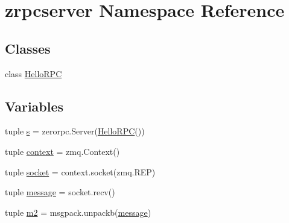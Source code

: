 \hypertarget{namespacezrpcserver}{\section{zrpcserver Namespace Reference}
\label{namespacezrpcserver}
}
\subsection*{Classes}
\begin{DoxyCompactItemize}
\item 
class \hyperlink{classzrpcserver_1_1_hello_r_p_c}{Hello\+R\+P\+C}
\end{DoxyCompactItemize}
\subsection*{Variables}
\begin{DoxyCompactItemize}
\item 
tuple \hyperlink{namespacezrpcserver_a27c4be0435b479044d8544312829e19f}{s} = zerorpc.\+Server(\hyperlink{classzrpcserver_1_1_hello_r_p_c}{Hello\+R\+P\+C}())
\item 
tuple \hyperlink{namespacezrpcserver_aba2558901917b86cf74044e3313df8d8}{context} = zmq.\+Context()
\item 
tuple \hyperlink{namespacezrpcserver_a5e4952d9f1e8548ca60fc87e02414711}{socket} = context.\+socket(zmq.\+R\+E\+P)
\item 
tuple \hyperlink{namespacezrpcserver_a3cf2b2246b68a156037b2a86b71282ff}{message} = socket.\+recv()
\item 
tuple \hyperlink{namespacezrpcserver_a867cc3b9e35ae551991976a86a47829d}{m2} = msgpack.\+unpackb(\hyperlink{namespacezrpcserver_a3cf2b2246b68a156037b2a86b71282ff}{message})
\end{DoxyCompactItemize}


